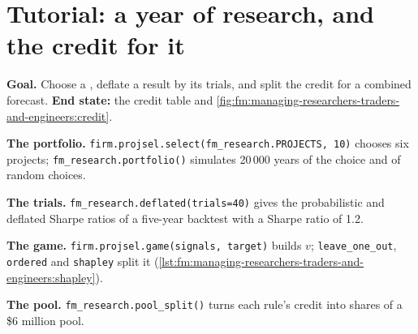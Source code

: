 \begin{omfigure}

\label{fig:fm:managing-researchers-traders-and-engineers:loops}
\end{omfigure}

\section{Tutorial: a year of research, and the credit for it}\label{tut:fm:managing-researchers-traders-and-engineers:tut}

\begin{tutorial}
\textbf{Goal.} Choose a , deflate a result by its trials, and split the credit for a combined forecast. \textbf{End state:} the
credit table and \cref{fig:fm:managing-researchers-traders-and-engineers:credit}.
\begin{tutsteps}
\item \textbf{The portfolio.} \texttt{firm.projsel.select(fm\_research.PROJECTS, 10)} chooses six projects; \texttt{fm\_research.portfolio()}
simulates 20\,000 years of the choice and of random choices.
\item \textbf{The trials.} \texttt{fm\_research.deflated(trials=40)} gives the probabilistic and deflated Sharpe ratios of a five-year backtest
with a Sharpe ratio of 1.2.
\item \textbf{The game.} \texttt{firm.projsel.game(signals, target)} builds $v$; \texttt{leave\_one\_out}, \texttt{ordered} and \texttt{shapley}
split it (\cref{lst:fm:managing-researchers-traders-and-engineers:shapley}).
\item \textbf{The pool.} \texttt{fm\_research.pool\_split()} turns each rule's credit into shares of a \$6 million pool.
\end{tutsteps}
\end{tutorial}

